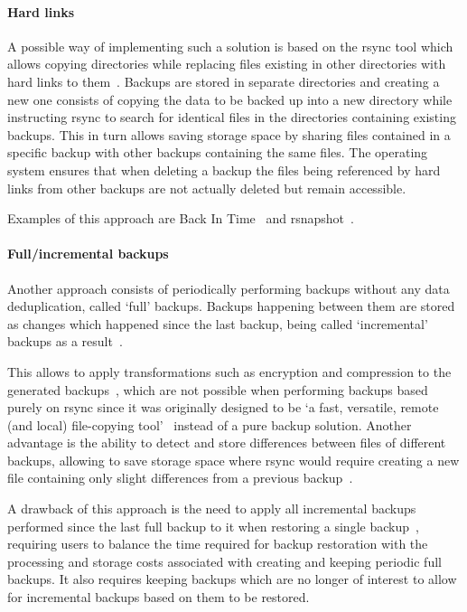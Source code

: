 \paragraph{Hard links} A possible way of implementing such a solution is based on the
rsync tool which allows copying directories while replacing files existing in
other directories with hard links to them~\cite[argument `--link-dest']{rsync}.
Backups are stored in separate directories and creating a new one consists of
copying the data to be backed up into a new directory while instructing rsync
to search for identical files in the directories containing existing backups.
This in turn allows saving storage space by sharing files contained in a specific
backup with other backups containing the same files.
The operating system ensures that when deleting a backup the files being referenced
by hard links from other backups are not actually deleted but remain accessible.

Examples of this approach are Back In Time~\cite{backintime} and rsnapshot~\cite{rsnapshot}.

\paragraph{Full/incremental backups} Another approach consists of periodically performing
backups without any data deduplication, called `full' backups.
Backups happening between them are stored as changes which happened since the last backup,
being called `incremental' backups as a result~\cite[section `OPERATION AND DATA FORMATS']{Duplicity}.

This allows to apply transformations such as encryption and compression to the generated
backups~\cite[section `DESCRIPTION']{Duplicity}, which are not possible when performing
backups based purely on rsync since it was originally designed to be
`a fast, versatile, remote (and local) file-copying tool'~\cite{rsync} instead
of a pure backup solution.
Another advantage is the ability to detect and store differences between files of different
backups, allowing to save storage space where rsync would require creating a new
file containing only slight differences from a previous backup~\cite[section `OPERATION AND DATA FORMATS']{Duplicity}.

A drawback of this approach is the need to apply all incremental backups performed since
the last full backup to it when restoring a single backup~\cite[section `OPERATION AND DATA FORMATS']{Duplicity},
requiring users to balance the time required for backup restoration with the processing
and storage costs associated with creating and keeping periodic full backups.
It also requires keeping backups which are no longer of interest to allow for
incremental backups based on them to be restored.


